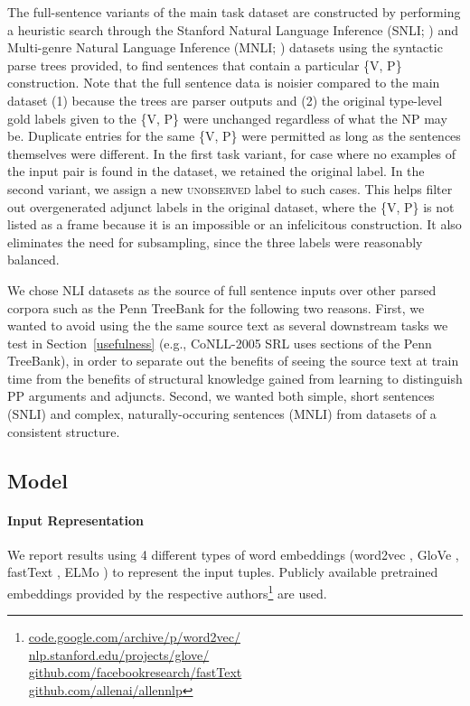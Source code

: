 \documentclass[letterpaper]{article} %
\begin{document}
The full-sentence variants of the main task dataset are constructed by performing a heuristic search through the Stanford Natural Language Inference (SNLI; \cite{bowman2015large}) and Multi-genre Natural Language Inference (MNLI; \cite{williams2018broad}) datasets using the syntactic parse trees provided, to find sentences that contain a particular \{\textsc{V, P}\} construction. Note that the full sentence data is noisier compared to the main dataset (1) because the trees are parser outputs and (2) the original type-level gold labels given to the \{\textsc{V, P}\} were unchanged regardless of what the NP may be. Duplicate entries for the same \{\textsc{V, P}\} were permitted as long as the sentences themselves were different. In the first task variant, for case where no examples of the input pair is found in the dataset, we retained the original label. In the second variant, we assign a new \textsc{unobserved} label to such cases. This helps filter out overgenerated adjunct labels in the original dataset, where the \{\textsc{V, P}\} is not listed as a frame because it is an impossible or an infelicitous construction. It also eliminates the need for subsampling, since the three labels were reasonably balanced. 

We chose NLI datasets as the source of full sentence inputs over other parsed corpora such as the Penn TreeBank for the following two reasons. First, we wanted to avoid using the the same source text as several downstream tasks we test in Section~\ref{usefulness} (e.g., CoNLL-2005 SRL \cite{carreras2005introduction} uses sections of the Penn TreeBank), in order to separate out the benefits of seeing the source text at train time from the benefits of structural knowledge gained from learning to distinguish PP arguments and adjuncts. Second, we wanted both simple, short sentences (SNLI) and complex, naturally-occuring sentences (MNLI) from datasets of a consistent structure.

\subsection{Model}
\label{ex1:model}
\paragraph{Input Representation} We report results using 4 different types of word embeddings (word2vec \cite{mikolov2013efficient}, GloVe \cite{pennington2014glove}, fastText \cite{bojanowski2016enriching}, ELMo \cite{peters2018deep}) to represent the input tuples. Publicly available pretrained embeddings provided by the respective authors\footnote{\url{code.google.com/archive/p/word2vec/}\\ \url{nlp.stanford.edu/projects/glove/}\\
\url{github.com/facebookresearch/fastText} \\
\url{github.com/allenai/allennlp}} are used.
\end{document}

